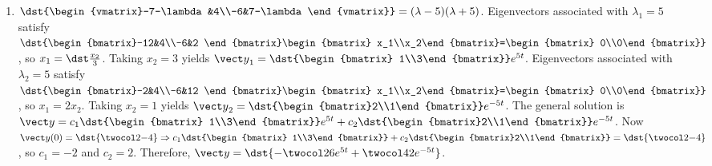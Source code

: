 \documentclass[openany]{book}
\newenvironment{sectionSolutions}{
 \begin{enumerate}[item-label={\thesection.\arabic{enumi}.}]
}{
 \end{enumerate}
}
\begin{document}
\begin{sectionSolutions}
\item
$\dst{\begin{vmatrix}-7-\lambda&4\\-6&7-\lambda\end{vmatrix}}
=(\lambda-5)(\lambda+5)$.
Eigenvectors  associated with $\lambda_1=5$  satisfy
$\dst{\begin{bmatrix}-12&4\\-6&2
\end{bmatrix}\begin{bmatrix}
x_1\\x_2\end{bmatrix}=\begin{bmatrix} 0\\0\end{bmatrix}}$,
so $x_1=\dst\frac{x_2}{3}$.  Taking $x_2=3$ yields
${\vect y}_1=\dst{\begin{bmatrix} 1\\3\end{bmatrix}}e^{5t}$.
Eigenvectors  associated with $\lambda_2=5$
satisfy
$\dst{\begin{bmatrix}-2&4\\-6&12
\end{bmatrix}\begin{bmatrix}
x_1\\x_2\end{bmatrix}=\begin{bmatrix} 0\\0\end{bmatrix}}$,
so $x_1=2x_2$.  Taking $x_2=1$ yields
${\vect y}_2=\dst{\begin{bmatrix}2\\1\end{bmatrix}}e^{-5t}$.
The general solution is
${\vect y}=c_1\dst{\begin{bmatrix}
1\\3\end{bmatrix}}e^{5t}+
c_2\dst{\begin{bmatrix}2\\1\end{bmatrix}}e^{-5t}$.
Now ${\vect y}(0)=\dst{\twocol2{-4}}\Rightarrow
c_1\dst{\begin{bmatrix}
1\\3\end{bmatrix}}+
c_2\dst{\begin{bmatrix}2\\1\end{bmatrix}}=\dst{\twocol2{-4}}$,
so $c_1=-2$ and $c_2=2$. Therefore,
${\vect y}=\dst{-\twocol26e^{5t}+\twocol42e^{-5t}}$.



\end{sectionSolutions}
\end{document}
